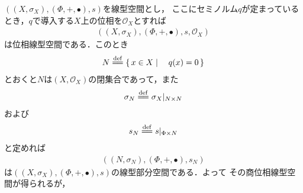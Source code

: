 	$\left((X,\sigma_X),(\Phi,+,\bullet),s\right)$を線型空間とし，
	ここにセミノルム$q$が定まっているとき，$q$で導入する$X$上の位相を$\mathscr{O}_X$とすれば
	\begin{align}
		\left((X,\sigma_X),(\Phi,+,\bullet),s,\mathscr{O}_X\right)
	\end{align}
	は位相線型空間である．このとき
	\begin{align}
		N \defeq \Set{x \in X}{q(x) = 0}
	\end{align}
	とおくと$N$は$\left(X,\mathscr{O}_X\right)$の閉集合であって，また
	\begin{align}
		\sigma_N \defeq \sigma_X|_{N \times N}
	\end{align}
	および
	\begin{align}
		s_N \defeq s|_{\Phi \times N}
	\end{align}
	と定めれば
	\begin{align}
		\left((N,\sigma_N),(\Phi,+,\bullet),s_N\right)
	\end{align}
	は$\left((X,\sigma_X),(\Phi,+,\bullet),s\right)$の線型部分空間である．よって
	その商位相線型空間が得られるが，